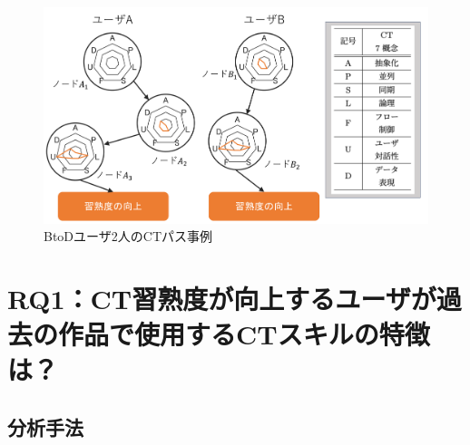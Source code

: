 \documentclass[submit]{ipsj}
\begin{document}
\begin{figure}[t]
    \centering
    \includegraphics[width=1.0\linewidth]{Okamoto_fig/graph.pdf}
    \caption{BtoDユーザ2人のCTパス事例}
    \label{fig:digraph}
    \vspace{-4mm}
\end{figure}

\section{RQ1：CT習熟度が向上するユーザが過去の作品で使用するCTスキルの特徴は？}\label{sec:chapter_3-2}
\subsection{分析手法}\label{sec:rq1-approach}

\end{document}
